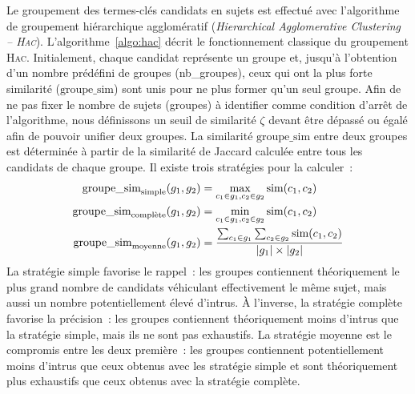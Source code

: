         Le groupement des termes-clés candidats en sujets est effectué avec
        l'algorithme de groupement hiérarchique agglomératif
        (\textit{Hierarchical Agglomerative Clustering -- \textsc{Hac}}).
        L'algorithme~\ref{algo:hac} décrit le fonctionnement classique du
        groupement \textsc{Hac}. Initialement, chaque candidat représente un
        groupe et, jusqu'à l'obtention d'un nombre prédéfini de groupes
        (nb\_groupes), ceux qui ont la plus forte similarité ($\text{groupe\_sim}$) sont
        unis pour ne plus former qu'un seul groupe. Afin de ne pas fixer le
        nombre de sujets (groupes) à identifier comme condition d'arrêt de
        l'algorithme, nous définissons un seuil de similarité $\zeta$ devant
        être dépassé ou égalé afin de pouvoir unifier deux groupes. La
        similarité $\text{groupe\_sim}$ entre deux groupes est déterminée à partir de la similarité
        de Jaccard calculée entre tous les candidats de chaque groupe. Il existe
        trois stratégies pour la calculer~:
        \begin{align}
          \textnormal{groupe\_sim}_{\textnormal{simple}}(g_1, g_2) &= \max_{c_1 \in g_1, c_2 \in g_2} \textnormal{sim}(c_1, c_2)\\
          \textnormal{groupe\_sim}_{\textnormal{complète}}(g_1, g_2) &= \min_{c_1 \in g_1, c_2 \in g_2} \textnormal{sim}(c_1, c_2)\\
            \textnormal{groupe\_sim}_{\textnormal{moyenne}}(g_1, g_2) &= \frac{\sum_{c_1 \in g_1}\sum_{c_2 \in g_2} \textnormal{sim}(c_1, c_2)}{|g_1| \times |g_2|}
        \end{align}
        La stratégie simple favorise le rappel~: les groupes contiennent
        théoriquement le plus grand nombre de candidats véhiculant effectivement
        le même sujet, mais aussi un nombre potentiellement élevé d'intrus. À
        l'inverse, la stratégie complète favorise la précision~: les groupes
        contiennent théoriquement moins d'intrus que la stratégie simple, mais
        ils ne sont pas exhaustifs. La stratégie moyenne est le compromis entre
        les deux première~: les groupes contiennent potentiellement moins
        d'intrus que ceux obtenus avec les stratégie simple et sont
        théoriquement plus exhaustifs que ceux obtenus avec la stratégie
        complète.

